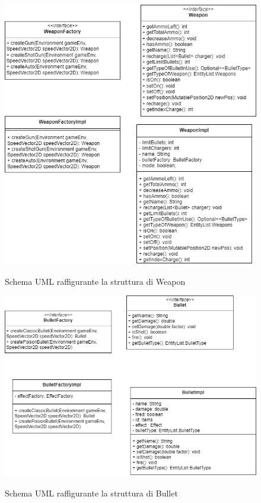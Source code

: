 \begin{figure}[H]
	\centering{}
	\includegraphics[width=\textwidth]{img/Weapon}
	\label{img:Weapon.png}
	\caption{Schema UML raffigurante la struttura di Weapon}
\end{figure}

\begin{figure}[H]
	\centering{}
	\includegraphics[width=\textwidth]{img/Bullet}
	\label{img:Bullet.png}
	\caption{Schema UML raffigurante la struttura di Bullet}
\end{figure}

